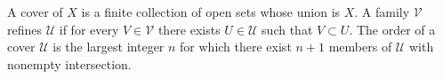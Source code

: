 A cover of $X$ is a finite collection of open sets whose union is $X$. A family $\mathcal{V}$ refines $\mathcal{U}$ if for every $V \in \mathcal{V}$ there exists $U \in \mathcal{U}$ such that $V \subset U$. The order of a cover $\mathcal{U}$ is the largest integer $n$ for which there exist $n+1$ members of $\mathcal{U}$ with nonempty intersection.
